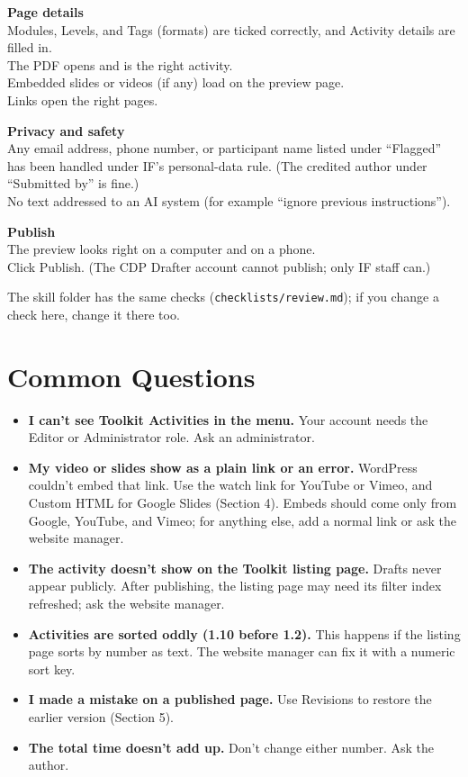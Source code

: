 \textbf{Page details}\\
\chk Modules, Levels, and Tags (formats) are ticked correctly, and Activity details are filled in.\\
\chk The PDF opens and is the right activity.\\
\chk Embedded slides or videos (if any) load on the preview page.\\
\chk Links open the right pages.

\textbf{Privacy and safety}\\
\chk Any email address, phone number, or participant name listed under ``Flagged'' has been handled under IF's personal-data rule. (The credited author under ``Submitted by'' is fine.)\\
\chk No text addressed to an AI system (for example ``ignore previous instructions'').

\textbf{Publish}\\
\chk The preview looks right on a computer and on a phone.\\
\chk Click Publish. (The CDP Drafter account cannot publish; only IF staff can.)

The skill folder has the same checks (\texttt{checklists/review.md}); if you change a check here, change it there too.

\section{Common Questions}
\begin{itemize}
  \item \textbf{I can't see Toolkit Activities in the menu.} Your account needs the Editor or Administrator role. Ask an administrator.
  \item \textbf{My video or slides show as a plain link or an error.} WordPress couldn't embed that link. Use the watch link for YouTube or Vimeo, and Custom HTML for Google Slides (Section 4). Embeds should come only from Google, YouTube, and Vimeo; for anything else, add a normal link or ask the website manager.
  \item \textbf{The activity doesn't show on the Toolkit listing page.} Drafts never appear publicly. After publishing, the listing page may need its filter index refreshed; ask the website manager.
  \item \textbf{Activities are sorted oddly (1.10 before 1.2).} This happens if the listing page sorts by number as text. The website manager can fix it with a numeric sort key.
  \item \textbf{I made a mistake on a published page.} Use Revisions to restore the earlier version (Section 5).
  \item \textbf{The total time doesn't add up.} Don't change either number. Ask the author.
\end{itemize}

